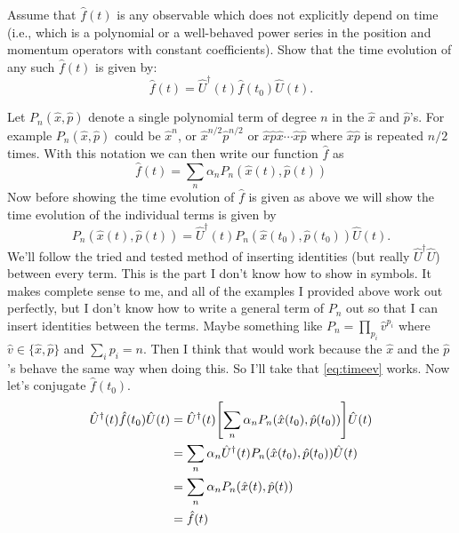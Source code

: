 \documentclass[boxes,pages]{homework}
\makeatletter
\newcommand{\herm}[1]{{{#1}^\dagger}}
\numberwithin{@problem}{section}
\makeatother
\begin{document}
\setcounter{section}{8}

\begin{problem}
Assume that $\hat{f}(t)$ is any observable which does not explicitly depend on time (i.e., which is a polynomial or a well-behaved power series in the position and momentum operators with constant coefficients). Show that the time evolution of any such $\hat{f}(t)$ is given by:
\begin{equation*}
	\hat{f}(t) = \herm{\hat{U}}(t)\hat{f}(t_0)\hat{U}(t).
\end{equation*}
\end{problem}

\begin{solution}
	Let $P_n(\hat{x}, \hat{p})$ denote a single polynomial term of degree $n$ in the $\hat{x}$ and $\hat{p}$'s. For example $P_n(\hat{x}, \hat{p})$ could be $\hat{x}^n$, or $\hat{x}^{n/2}\hat{p}^{n/2}$ or $\hat{x}\hat{p}\hat{x}\cdots\hat{x}\hat{p}$ where $\hat{x}\hat{p}$ is repeated $n/2$ times. With this notation we can then write our function $\hat{f}$ as
	\begin{equation*}
		\hat{f}(t) = \sum_n \alpha_nP_n(\hat{x}(t), \hat{p}(t))
	\end{equation*}
	Now before showing the time evolution of $\hat{f}$ is given as above we will show the time evolution of the individual terms is given by
	\begin{equation}\label{eq:timeev}
		P_n(\hat{x}(t), \hat{p}(t)) = \herm{\hat{U}}(t)P_n(\hat{x}(t_0), \hat{p}(t_0))\hat{U}(t).
	\end{equation}
	We'll follow the tried and tested method of inserting identities (but really $\herm{\hat{U}}\hat{U}$) between every term. This is the part I don't know how to show in symbols. It makes complete sense to me, and all of the examples I provided above work out perfectly, but I don't know how to write a general term of $P_n$ out so that I can insert identities between the terms. Maybe something like $P_n = \prod_{p_i} \hat{v}^{p_i}$ where $\hat{v}\in\{\hat{x}, \hat{p}\}$ and $\sum_i p_i = n$. Then I think that would work because the $\hat{x}$ and the $\hat{p}$'s behave the same way when doing this. So I'll take that \cref{eq:timeev} works. Now let's conjugate $\hat{f}(t_0)$.
	\begin{align*}
		\herm{\hat{U}}(t)\hat{f}(t_0)\hat{U}(t) & = \herm{\hat{U}}(t)\qty[\sum_n \alpha_nP_n(\hat{x}(t_0), \hat{p}(t_0))]\hat{U}(t) \\
		                                        & = \sum_n \alpha_n\herm{\hat{U}}(t)P_n(\hat{x}(t_0), \hat{p}(t_0))\hat{U}(t)       \\
		                                        & = \sum_n \alpha_n P_n(\hat{x}(t), \hat{p}(t))                                     \\
		                                        & = \hat{f}(t)
	\end{align*}

\end{solution}
\end{document}

